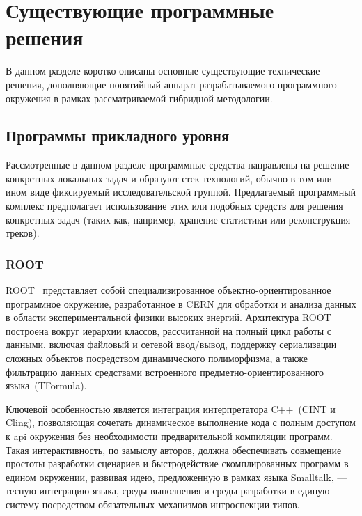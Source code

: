 \section{Существующие программные решения}

В данном разделе коротко описаны основные существующие
технические решения, дополняющие понятийный аппарат разрабатываемого
программного окружения в рамках рассматриваемой гибридной методологии.

\subsection{Программы прикладного уровня}

Рассмотренные в данном разделе программные средства
направлены на решение конкретных локальных задач и образуют стек
технологий, обычно в том или ином виде фиксируемый исследовательской группой.
Предлагаемый программный комплекс предполагает использование этих
или подобных средств для решения конкретных задач (таких как, например,
хранение статистики или реконструкция треков).

\subsubsection{ROOT}

ROOT~\cite{ROOT-framework} представляет собой специализированное
объектно-ориентированное программное окружение, разработанное в CERN
для обработки и анализа данных в области экспериментальной физики
высоких энергий. Архитектура ROOT построена вокруг иерархии классов,
рассчитанной на полный цикл работы с данными, включая файловый и
сетевой ввод/вывод, поддержку сериализации сложных объектов
посредством динамического полиморфизма, а также фильтрацию данных
средствами встроенного предметно-ориентированного языка~(TFormula).

Ключевой особенностью является интеграция интерпретатора C++~(CINT и Cling),
позволяющая сочетать динамическое выполнение кода с полным доступом
к \acrshort{api} окружения без необходимости предварительной компиляции
программ. Такая интерактивность, по замыслу авторов, должна обеспечивать
совмещение простоты разработки сценариев и быстродействие
скомплированных программ в едином окружении, развивая идею, предложенную в
рамках языка Smalltalk, — тесную интеграцию языка, среды
выполнения и среды разработки в единую систему посредством
обязательных механизмов интроспекции типов.

